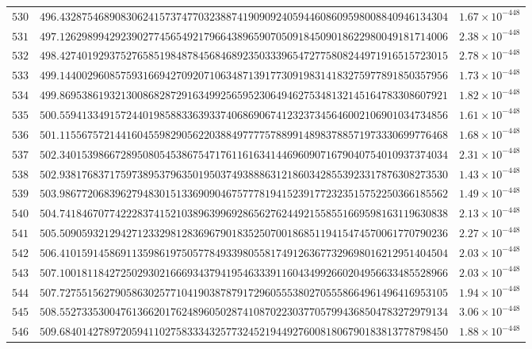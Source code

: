 \documentclass[12pt,reqno]{amsart}
\theoremstyle{remark}
\begin{document}
\begin{longtable}{clc}
$530$ & $496.4328754689083062415737477032388741909092405944608609598008840946134304$ & $1.67\times 10^{-448}$ \\
$531$ & $497.1262989942923902774565492179664389659070509184509018622980049181714006$ & $2.38\times 10^{-448}$ \\
$532$ & $498.4274019293752765851984878456846892350333965472775808244971916515723015$ & $2.78\times 10^{-448}$ \\
$533$ & $499.1440029608575931669427092071063487139177309198314183275977891850357956$ & $1.73\times 10^{-448}$ \\
$534$ & $499.8695386193213008682872916349925659523064946275348132145164783308607921$ & $1.82\times 10^{-448}$ \\
$535$ & $500.5594133491572440198588336393374068690674123237345646002106901034734856$ & $1.61\times 10^{-448}$ \\
$536$ & $501.1155675721441604559829056220388497777578899148983788571973330699776468$ & $1.68\times 10^{-448}$ \\
$537$ & $502.3401539866728950805453867547176116163414469609071679040754010937374034$ & $2.31\times 10^{-448}$ \\
$538$ & $502.9381768371759738953796350195037493888631218603428553923317876308273530$ & $1.43\times 10^{-448}$ \\
$539$ & $503.9867720683962794830151336909046757778194152391772323515752250366185562$ & $1.49\times 10^{-448}$ \\
$540$ & $504.7418467077422283741521038963996928656276244921558551669598163119630838$ & $2.13\times 10^{-448}$ \\
$541$ & $505.5090593212942712332981283696790183525070018685119415474570061770790236$ & $2.27\times 10^{-448}$ \\
$542$ & $506.4101591458691135986197505778493398055817491263677329698016212951404504$ & $2.03\times 10^{-448}$ \\
$543$ & $507.1001811842725029302166693437941954633391160434992660204956633485528966$ & $2.03\times 10^{-448}$ \\
$544$ & $507.7275515627905863025771041903878791729605553802705558664961496416953105$ & $1.94\times 10^{-448}$ \\
$545$ & $508.5527335300476136620176248960502874108702230377057994368504783272979134$ & $3.06\times 10^{-448}$ \\
$546$ & $509.6840142789720594110275833343257732452194492760081806790183813778798450$ & $1.88\times 10^{-448}$ \\

\end{longtable}
\end{document}
